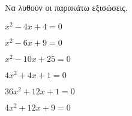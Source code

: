 Να λυθούν οι παρακάτω εξισώσεις.
\begin{multicols}{2}
\begin{alist}[leftmargin=1mm]
\item $ x^2-4x+4=0 $
\item $ x^2-6x+9=0 $
\item $ x^2-10x+25=0 $
\item $ 4x^2+4x+1=0 $
\item $ 36x^2+12x+1=0 $
\item $ 4x^2+12x+9=0 $
\end{alist}
\end{multicols}
